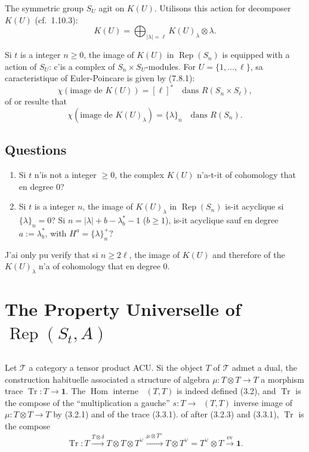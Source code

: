 \documentclass[11pt,a4paper]{article}
\theoremstyle{plain}
\theoremstyle{definition}
\DeclareMathOperator{\Hom}{Hom}
\DeclareMathOperator{\Tr}{Tr}
\DeclareMathOperator{\Rep}{Rep}
\newcommand{\ev}{\mathrm{ev}}
\DeclareMathOperator{\iHom}{\underline{Hom}}
\begin{document}
The symmetric group $S_U$ agit on $K(U)$. Utilisons this action for decomposer $K(U)$ (cf.~1.10.3):
\[
K(U) = \bigoplus_{|\lambda| = \ell} K(U)_\lambda \otimes \lambda.
\]

Si $t$ is a integer $n \geq 0$, the image of $K(U)$ in $\Rep(S_n)$ is equipped with a action of $S_U$: c'is a complex of $S_n \times S_U$-modules. For $U = \{1, \ldots, \ell\}$, sa caracteristique of Euler-Poincare is given by (7.8.1):
\begin{equation}
\chi(\text{image de } K(U)) = [\ell]^* \quad \text{dans } R(S_n \times S_\ell), \tag{7.12.1}
\end{equation}
of or resulte that
\begin{equation}
\chi(\text{image de } K(U)_\lambda) = \{\lambda\}_n \quad \text{dans } R(S_n). \tag{7.12.2}
\end{equation}

\subsection{Questions}
\begin{enumerate}[label=(\roman*)]
\item Si $t$ n'is not a integer $\geq 0$, the complex $K(U)$ n'a-t-it of cohomology that en degree $0$?
\item Si $t$ is a integer $n$, the image of $K(U)_\lambda$ in $\Rep(S_n)$ is-it acyclique si $\{\lambda\}_n = 0$? Si $n = |\lambda| + b - \lambda^*_b - 1$ ($b \geq 1$), is-it acyclique sauf en degree $a := \lambda^*_b$, with $H^a = \{\lambda\}^+_n$?
\end{enumerate}

J'ai only pu verify that si $n \geq 2\ell$, the image of $K(U)$ and therefore of the $K(U)_\lambda$ n'a of cohomology that en degree $0$.


\section{The Property Universelle of $\Rep(S_t, A)$}

\subsection{}
Let $\mathcal{T}$ a category a tensor product ACU. Si the object $T$ of $\mathcal{T}$ admet a dual, the construction habituelle associated a structure of algebra $\mu : T \otimes T \to T$ a morphism trace $\Tr : T \to \mathbf{1}$. The $\Hom$ interne $\iHom(T, T)$ is indeed defined (3.2), and $\Tr$ is the compose of the ``multiplication a gauche'' $s : T \to \iHom(T, T)$ inverse image of $\mu : T \otimes T \to T$ by (3.2.1) and of the trace (3.3.1). of after (3.2.3) and (3.3.1), $\Tr$ is the compose
\begin{equation}
\Tr : T \xrightarrow{T \otimes \delta} T \otimes T \otimes T^\vee \xrightarrow{\mu \otimes T^\vee} T \otimes T^\vee = T^\vee \otimes T \xrightarrow{\ev} \mathbf{1}. \tag{8.1.1}
\end{equation}
\end{document}
